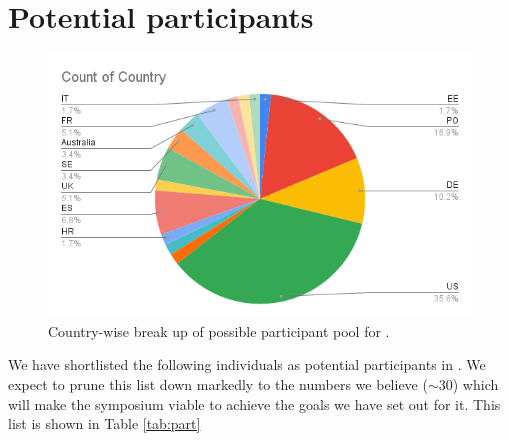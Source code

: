 \section{Potential participants}
\label{sec:part}

\begin{figure}
  \vspace{-0.5cm}
  \centering 
  \includegraphics[scale=0.4]{fig/country.png}
  \caption{Country-wise break up of possible participant pool for \sympe.}
  \label{fig:country}
\end{figure}

We have shortlisted the following individuals as potential participants
in \sympe. We expect to prune this list down markedly to the numbers we
believe ($\sim 30$) which will make the symposium viable to achieve the
goals we have set out for it. This list is shown in Table \ref{tab:part}


